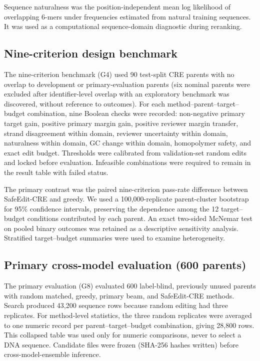 Sequence naturalness was the position-independent mean log likelihood of overlapping
6-mers under frequencies estimated from natural training sequences. It was used as a
computational sequence-domain diagnostic during reranking.

\subsection{Nine-criterion design benchmark}

The nine-criterion benchmark (G4) used 90 test-split CRE parents with no overlap to
development or primary-evaluation parents (six nominal parents were excluded
after identifier-level overlap with an exploratory benchmark was discovered, without
reference to outcomes). For each method--parent--target--budget
combination, nine Boolean checks were recorded: non-negative primary target gain,
positive primary margin gain, positive reviewer margin transfer, strand disagreement
within domain, reviewer uncertainty within domain, naturalness within domain, GC
change within domain, homopolymer safety, and exact edit budget. Thresholds were
calibrated from validation-set random edits and locked before evaluation. Infeasible
combinations were required to remain in the result table with failed status.

The primary contrast was the paired nine-criterion pass-rate difference between
SafeEdit-CRE and greedy. We used a 100,000-replicate parent-cluster bootstrap for 95\%
confidence intervals, preserving the dependence among the 12 target--budget
conditions contributed by each parent. An exact two-sided McNemar test on pooled
binary outcomes was retained as a descriptive sensitivity analysis. Stratified
target--budget summaries were used to examine heterogeneity.

\subsection{Primary cross-model evaluation (600 parents)}

The primary evaluation (G8) evaluated 600 label-blind, previously unused parents with
random matched, greedy, primary beam, and SafeEdit-CRE methods. Search produced 43,200
sequence rows because random editing had three replicates. For method-level
statistics, the three random replicates were averaged to one numeric record per
parent--target--budget combination, giving 28,800 rows. This collapsed table was used
only for numeric comparisons, never to select a DNA sequence. Candidate files were
frozen (SHA-256 hashes written) before cross-model-ensemble inference.

